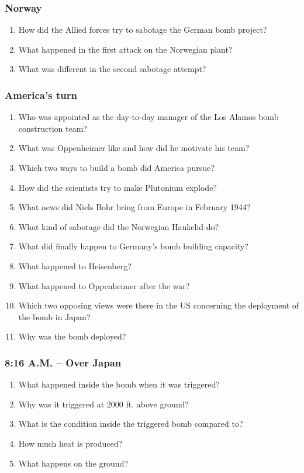 \subsubsection*{Norway}
\begin{enumerate}  
\item How did the Allied forces try to sabotage the German bomb project?
\item What happened in the first attack on the Norwegian plant? 
\item What was different in the second sabotage attempt?
\end{enumerate}

\subsubsection*{America’s turn}
\begin{enumerate}  
\item Who was appointed as the day-to-day manager of the Los Alamos bomb construction team?
\item What was Oppenheimer like and how did he motivate his team? 
\item Which two ways to build a bomb did America pursue?
\item How did the scientists try to make Plutonium explode?
\item What news did Niels Bohr bring from Europe in February 1944?
\item What kind of sabotage did the Norwegian Haukelid do?
\item What did finally happen to Germany’s bomb building capacity?
\item What happened to Heisenberg?
\item What happened to Oppenheimer after the war?
\item Which two opposing views were there in the US concerning the deployment of the bomb in Japan?
\item Why was the bomb deployed?
\end{enumerate}

\subsubsection*{8:16 A.M. – Over Japan}
\begin{enumerate}  
\item What happened inside the bomb when it was triggered?
\item Why was it triggered at 2000 ft. above ground? 
\item What is the condition inside the triggered bomb compared to?
\item How much heat is produced?
\item What happens on the ground?
\end{enumerate}

